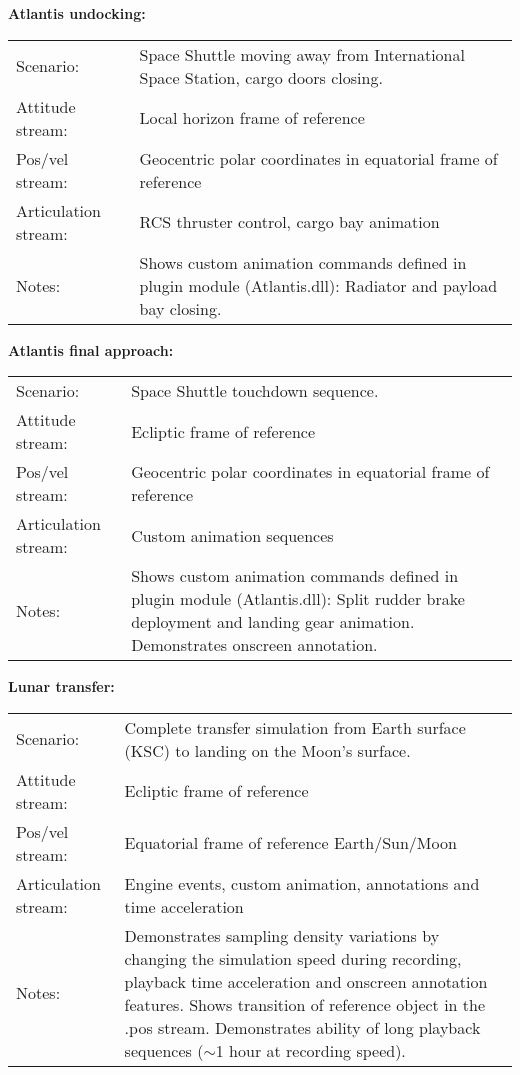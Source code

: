 \documentclass[Orbiter Technical Reference.tex]{subfiles}
\begin{document}
\noindent
\textbf{Atlantis undocking:}
\begin{table}[H]
	\centering
	\begin{tabularx}{\textwidth}{ l X }
	Scenario: & Space Shuttle moving away from International Space Station, cargo doors closing.\\
	Attitude stream: & Local horizon frame of reference\\
	Pos/vel stream: & Geocentric polar coordinates in equatorial frame of reference\\
	Articulation stream: & RCS thruster control, cargo bay animation\\
	Notes: & Shows custom animation commands defined in plugin module (Atlantis.dll): Radiator and payload bay closing.\\
	\end{tabularx}
\end{table}

\noindent
\textbf{Atlantis final approach:}
\begin{table}[H]
	\centering
	\begin{tabularx}{\textwidth}{ l X }
	Scenario: & Space Shuttle touchdown sequence.\\
	Attitude stream: & Ecliptic frame of reference\\
	Pos/vel stream: & Geocentric polar coordinates in equatorial frame of reference\\
	Articulation stream: & Custom animation sequences\\
	Notes: & Shows custom animation commands defined in plugin module (Atlantis.dll): Split rudder brake deployment and landing gear animation. Demonstrates onscreen annotation.\\
	\end{tabularx}
\end{table}

\noindent
\textbf{Lunar transfer:}
\begin{table}[H]
	\centering
	\begin{tabularx}{\textwidth}{ l X }
	Scenario: & Complete transfer simulation from Earth surface (KSC) to landing on the Moon's surface.\\
	Attitude stream: & Ecliptic frame of reference\\
	Pos/vel stream: & Equatorial frame of reference Earth/Sun/Moon\\
	Articulation stream: & Engine events, custom animation, annotations and time acceleration\\
	Notes: & Demonstrates sampling density variations by changing the simulation speed during recording, playback time acceleration and onscreen annotation features. Shows transition of reference object in the .pos stream. Demonstrates ability of long playback sequences ($\sim$1 hour at recording speed).\\
	\end{tabularx}
\end{table}
\end{document}
